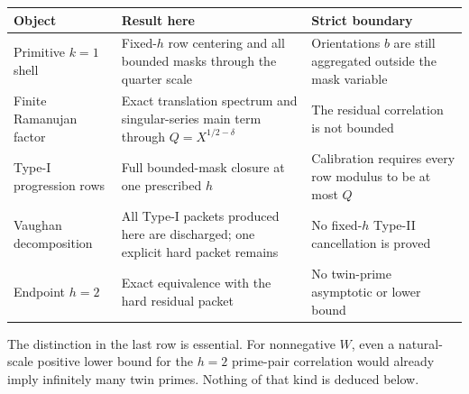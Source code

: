 \begin{center}
\small
\begin{tabular}{@{}>{\raggedright\arraybackslash}p{}
                    >{\raggedright\arraybackslash}p{}
                    >{\raggedright\arraybackslash}p{}@{}}
\toprule
Object & Result here & Strict boundary\\
\midrule
Primitive $k=1$ shell
& Fixed-$h$ row centering and all bounded masks through the quarter scale
& Orientations $b$ are still aggregated outside the mask variable\\
Finite Ramanujan factor
& Exact translation spectrum and singular-series main term through
$Q=X^{1/2-\delta}$
& The residual correlation is not bounded\\
Type-I progression rows
& Full bounded-mask closure at one prescribed $h$
& Calibration requires every row modulus to be at most $Q$\\
Vaughan decomposition
& All Type-I packets produced here are discharged; one explicit hard packet remains
& No fixed-$h$ Type-II cancellation is proved\\
Endpoint $h=2$
& Exact equivalence with the hard residual packet
& No twin-prime asymptotic or lower bound\\
\bottomrule
\end{tabular}
\end{center}

The distinction in the last row is essential.  For nonnegative $W$, even
a natural-scale positive lower bound for the $h=2$ prime-pair correlation
would already imply infinitely many twin primes.  Nothing of that kind is
deduced below.
